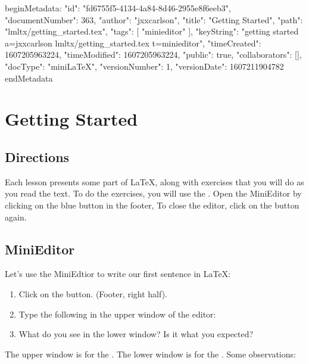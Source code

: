 beginMetadata:
{
    "id": "fd6755f5-4134-4a84-8d46-2955e8f6eeb3",
    "documentNumber": 363,
    "author": "jxxcarlson",
    "title": "Getting Started",
    "path": "lmltx/getting_started.tex",
    "tags": [
        "minieditor"
    ],
    "keyString": "getting started a=jxxcarlson lmltx/getting_started.tex t=minieditor",
    "timeCreated": 1607205963224,
    "timeModified": 1607205963224,
    "public": true,
    "collaborators": [],
    "docType": "miniLaTeX",
    "versionNumber": 1,
    "versionDate": 1607211904782
}
endMetadata

\setcounter{section}{2}

\section{Getting Started}

\innertableofcontents

\subsection{Directions}

Each lesson presents some part of LaTeX, along with exercises that you will do as you read the text.  To do the exercises, you will use the .  Open the MiniEditor by clicking on the blue  button in the footer,  To close the editor, click on the button again.  

\subsection{MiniEditor}

Let's use the MiniEdtior to write our first sentence in LaTeX:

\begin{enumerate}

\item Click on the  button. (Footer, right half).

\item Type the following in the upper window of the editor: 

\item What do you see in the lower window?   Is it what you expected?

\end{enumerate}

The upper window is for the .  The lower window is for the .   Some observations:

